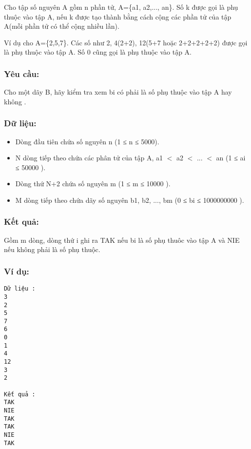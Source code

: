 



   Cho tập số nguyên A gồm n phần tử, A=\{a1, a2,..., an\}. Số k được gọi là phụ thuộc vào tập A, nếu k được tạo thành bằng cách cộng các phần tử của tập A(mỗi phần tử có thể cộng nhiều lần).  

   Ví dụ  cho A=\{2,5,7\}.  Các số như 2, 4(2+2), 12(5+7 hoặc 2+2+2+2+2) được gọi là phụ thuộc vào tập A. Số 0 cũng gọi là phụ thuộc vào tập A.  

\subsubsection{   Yêu cầu:  }

   Cho một dãy B, hãy kiểm tra xem bi có phải là số phụ thuộc vào tập A hay không .  

\subsubsection{   Dữ liệu:  }
\begin{itemize}
	\item     Dòng đầu tiên chứa số nguyên n (1 ≤ n ≤ 5000).   
	\item     N dòng tiếp theo chứa các phân tử của tập A, a1 $<$ a2 $<$ ... $<$ an  (1  ≤ ai  ≤ 50000 ).   
	\item     Dòng thứ N+2 chứa số nguyên m (1 ≤ m ≤ 10000 ).   
	\item     M dòng tiếp theo chứa dãy số nguyên b1, b2, ..., bm (0 ≤ bi ≤ 1000000000 ).   
\end{itemize}

\subsubsection{   Kết quả:  }

   Gồm m dòng, dòng thứ i ghi ra TAK nếu bi là số phụ thuôc vào tập A và NIE nếu không phải là số phụ thuộc.  

\subsubsection{   Ví dụ:  }
\begin{verbatim}
Dữ liệu :
3
2
5
7
6
0
1
4
12
3
2

Kết quả :
TAK
NIE
TAK
TAK
NIE
TAK



\end{verbatim}
